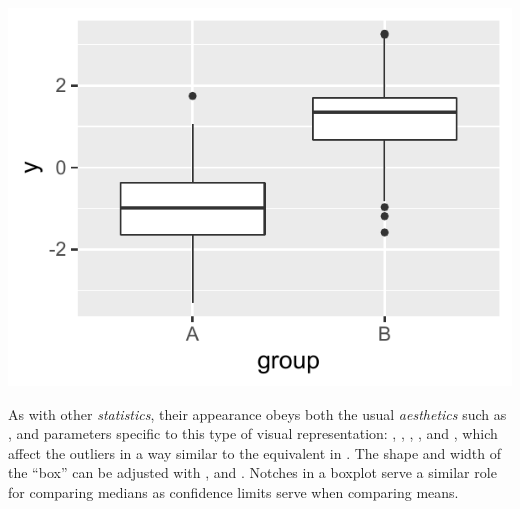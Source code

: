 \documentclass[krantz2]{krantz}\usepackage{knitr}
\begin{document}
\begin{knitrout}\footnotesize
{}\color{fgcolor}\begin{kframe}
\begin{alltt}
  \hlopt{+}
  \hlstd{()}
\end{alltt}
\end{kframe}

{\centering \includegraphics[width=.54\textwidth]{figure/pos-bw-plot-01-1}

}



\end{knitrout}

As with other \emph{statistics}, their appearance obeys both the usual \emph{aesthetics} such as , and parameters specific to this type of visual representation: , , , ,  and , which affect the outliers in a way similar to the equivalent  in . The shape and width of the ``box'' can be adjusted with ,  and . Notches in a boxplot serve a similar role for comparing medians as confidence limits serve when comparing means.
\end{document}
